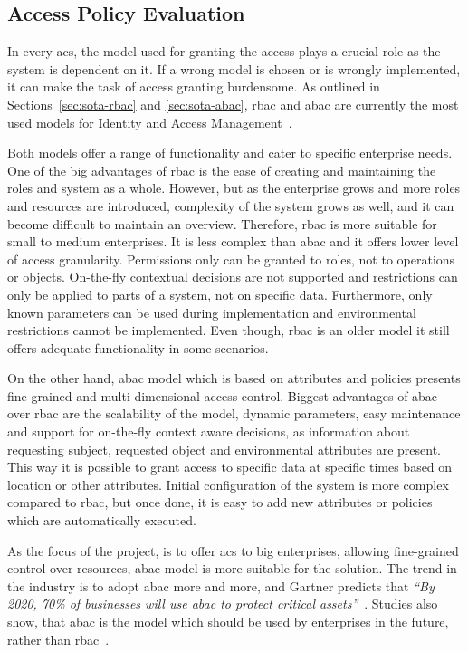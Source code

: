 \subsection{Access Policy Evaluation}\label{sec:analysis-access-policy}

In every \acrlong{acs}, the model used for granting the access plays a crucial role as the system is dependent on it. If a wrong model is chosen or is wrongly implemented, it can make the task of access granting burdensome. As outlined in Sections~\ref{sec:sota-rbac} and \ref{sec:sota-abac}, \acrshort{rbac} and \acrshort{abac} are currently the most used models for Identity and Access Management~\cite{2018BestV3}.

Both models offer a range of functionality and cater to specific enterprise needs. One of the big advantages of \acrshort{rbac} is the ease of creating and maintaining the roles and system as a whole. However, but as the enterprise grows and more roles and resources are introduced, complexity of the system grows as well, and it can become difficult to maintain an overview. Therefore, \acrshort{rbac} is more suitable for small to medium enterprises. It is less complex than \acrshort{abac} and it offers lower level of access granularity. Permissions only can be granted to roles, not to operations or objects. On-the-fly contextual decisions are not supported and restrictions can only be applied to parts of a system, not on specific data. Furthermore, only known parameters can be used during implementation and environmental restrictions cannot be implemented. Even though, \acrshort{rbac} is an older model it still offers adequate functionality in some scenarios.

On the other hand, \acrshort{abac} model which is based on attributes and policies presents fine-grained and multi-dimensional access control. Biggest advantages of \acrshort{abac} over \acrshort{rbac} are the scalability of the model, dynamic parameters, easy maintenance and support for on-the-fly context aware decisions, as information about requesting subject, requested object and environmental attributes are present. This way it is possible to grant access to specific data at specific times based on location or other attributes. Initial configuration of the system is more complex compared to \acrshort{rbac}, but once done, it is easy to add new attributes or policies which are automatically executed. 

As the focus of the project, is to offer \acrlong{acs} to big enterprises, allowing fine-grained control over resources, \acrlong{abac} model is more suitable for the solution. The trend in the industry is to adopt \acrshort{abac} more and more, and Gartner predicts that \textit{``By 2020, 70\% of businesses will use \acrshort{abac} to protect critical assets''}~\cite{GartnerGartnerPredictions}. Studies also show, that \acrshort{abac} is the model which should be used by enterprises in the future, rather than \acrshort{rbac}~\cite{Fatima2016TowardsArgument}.

